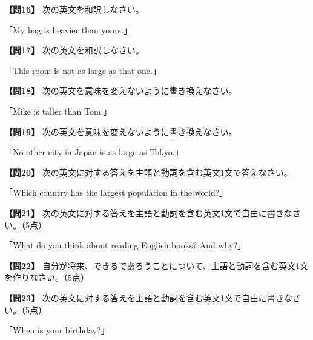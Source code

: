 \testquestion
\noindent\textbf{【問16】} 次の英文を和訳しなさい。

\noindent「My bag is heavier than yours.」

\testqsep

\testquestion
\noindent\textbf{【問17】} 次の英文を和訳しなさい。

\noindent「This room is not as large as that one.」

\testqsep

\testquestion
\noindent\textbf{【問18】} 次の英文を意味を変えないように書き換えなさい。

\noindent「Mike is taller than Tom.」

\testqsep

\testquestion
\noindent\textbf{【問19】} 次の英文を意味を変えないように書き換えなさい。

\noindent「No other city in Japan is as large as Tokyo.」

\testqsep

\testquestion
\noindent\textbf{【問20】} 次の英文に対する答えを主語と動詞を含む英文1文で答えなさい。

\noindent「Which country has the largest population in the world?」

\testqsep

\testsectsep
\testquestion
\noindent\textbf{【問21】} 次の英文に対する答えを主語と動詞を含む英文1文で自由に書きなさい。（5点）

\noindent「What do you think about reading English books? And why?」

\testqsep

\testquestion
\noindent\textbf{【問22】} 自分が将来、できるであろうことについて、主語と動詞を含む英文1文を作りなさい。（5点）

\testqsep

\testquestionwide
\noindent\textbf{【問23】} 次の英文に対する答えを主語と動詞を含む英文1文で自由に書きなさい。（5点）

\noindent「When is your birthday?」

\testqsep

